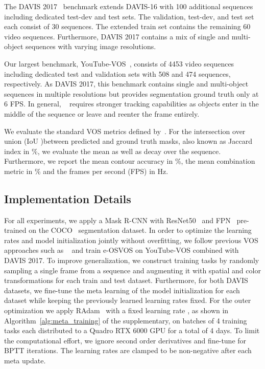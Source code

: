 \documentclass{article}
\begin{document}
        The DAVIS 2017~\cite{DAVIS17semi} benchmark extends DAVIS-16 with 100 additional sequences including dedicated test-dev and test sets.
The validation, test-dev, and test set each consist of 30 sequences.
The extended train set contains the remaining 60 video sequences.
Furthermore, DAVIS 2017 contains a mix of single and multi-object sequences with varying image resolutions.

        Our largest benchmark, YouTube-VOS~\cite{Xu2018YouTubeVOSAL}, consists of 4453 video sequences including dedicated test and validation sets with 508 and 474 sequences, respectively.
As DAVIS 2017, this benchmark contains single and multi-object sequences in multiple resolutions but provides segmentation ground truth only at 6 FPS.
In general, ~\cite{Xu2018YouTubeVOSAL} requires stronger tracking capabilities as objects enter in the middle of the sequence or leave and reenter the frame entirely.

      \label{sec:eval_metrics}
We evaluate the standard VOS metrics defined by~\cite{DAVIS16}.
For the intersection over union (IoU )between predicted and ground truth masks, also known as Jaccard index  in \%, we evaluate the mean as well as decay over the sequence.
Furthermore, we report the mean contour accuracy  in \%, the mean combination metric  in \% and the frames per second (FPS) in Hz.




\subsection{Implementation Details}  \label{sec:imp_details}

    For all experiments, we apply a Mask R-CNN with ResNet50~\cite{DBLP:journals/corr/HeZRS15} and FPN~\cite{FPN_2017_CVPR} pre-trained on the COCO~\cite{ms_coco} segmentation dataset.
In order to optimize the learning rates and model initialization jointly without overfitting, we follow previous VOS approaches such as ~\cite{voigtlaender2019feelvos,stm} and train e-OSVOS on YouTube-VOS combined with DAVIS 2017.
To improve generalization, we construct training tasks  by randomly sampling a single frame from a sequence and augmenting it with spatial and color transformations for each train and test dataset.
Furthermore, for both DAVIS datasets, we fine-tune the meta learning of the model initialization for each dataset while keeping the previously learned learning rates fixed.
For the outer optimization we apply RAdam~\cite{liu2019radam} with a fixed learning rate , as shown in Algorithm~\ref*{alg:meta_training} of the supplementary, on batches of 4 training tasks each distributed to a Quadro RTX 6000 GPU for a total of 4 days.
To limit the computational effort, we ignore second order derivatives and fine-tune for  BPTT iterations. The learning rates are clamped to be non-negative after each meta update.
\end{document}
